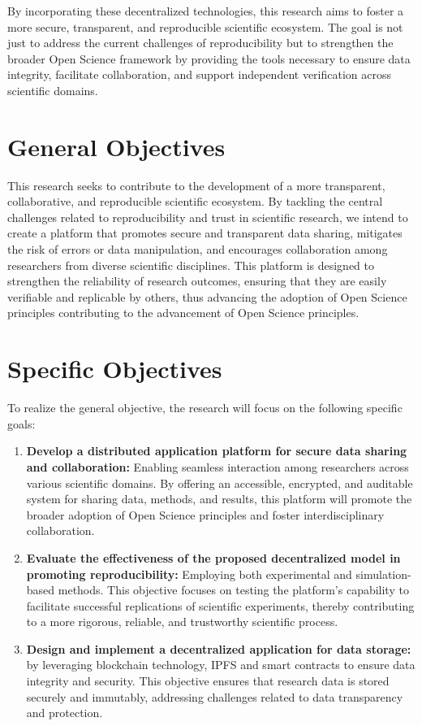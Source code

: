 \documentclass{article}
\begin{document}
By incorporating these decentralized technologies, this research aims to foster a more secure, transparent, and reproducible scientific ecosystem. The goal is not just to address the current challenges of reproducibility but to strengthen the broader Open Science framework by providing the tools necessary to ensure data integrity, facilitate collaboration, and support independent verification across scientific domains.

\section{General Objectives}

This research seeks to contribute to the development of a more transparent, collaborative, and reproducible scientific ecosystem. By tackling the central challenges related to reproducibility and trust in scientific research, we intend to create a platform that promotes secure and transparent data sharing, mitigates the risk of errors or data manipulation, and encourages collaboration among researchers from diverse scientific disciplines. This platform is designed to strengthen the reliability of research outcomes, ensuring that they are easily verifiable and replicable by others, thus advancing the adoption of Open Science principles contributing to the advancement of Open Science principles.

\section{Specific Objectives}

To realize the general objective, the research will focus on the following specific goals:

\begin{enumerate}
    \item \textbf{Develop a distributed application platform for secure data sharing and collaboration:} Enabling seamless interaction among researchers across various scientific domains. By offering an accessible, encrypted, and auditable system for sharing data, methods, and results, this platform will promote the broader adoption of Open Science principles and foster interdisciplinary collaboration.

    \item \textbf{Evaluate the effectiveness of the proposed decentralized model in promoting reproducibility:} Employing both experimental and simulation-based methods. This objective focuses on testing the platform's capability to facilitate successful replications of scientific experiments, thereby contributing to a more rigorous, reliable, and trustworthy scientific process.

    \item \textbf{Design and implement a decentralized application for data storage:} by leveraging blockchain technology, IPFS and smart contracts to ensure data integrity and security. This objective ensures that research data is stored securely and immutably, addressing challenges related to data transparency and protection.
\end{enumerate}
\end{document}
